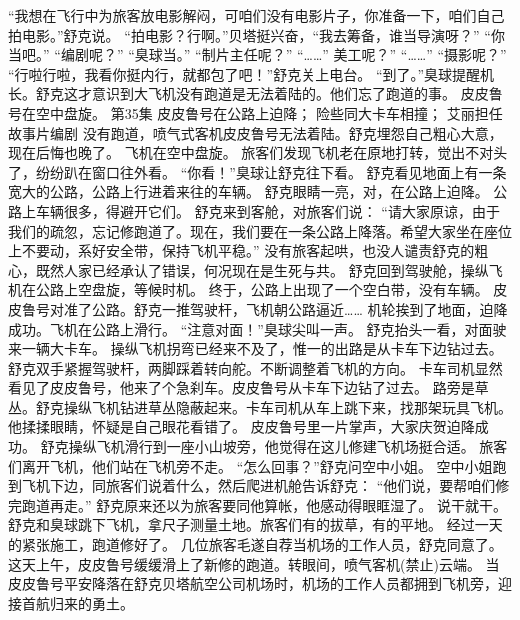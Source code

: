 \documentclass[a4paper,12pt,UTF8,twoside]{ctexbook}
\begin{document}
        “我想在飞行中为旅客放电影解闷，可咱们没有电影片子，你准备一下，咱们自己拍电影。”舒克说。 
        “拍电影？行啊。”贝塔挺兴奋，“我去筹备，谁当导演呀？” 
        “你当吧。” 
        “编剧呢？” 
        “臭球当。” 
        “制片主任呢？” 
        “……” 
        美工呢？” 
        “……” 
        “摄影呢？” 
        “行啦行啦，我看你挺内行，就都包了吧！”舒克关上电台。 
        “到了。”臭球提醒机长。舒克这才意识到大飞机没有跑道是无法着陆的。他们忘了跑道的事。 
        皮皮鲁号在空中盘旋。   第35集 
        皮皮鲁号在公路上迫降； 
        险些同大卡车相撞； 
        艾丽担任故事片编剧   
        没有跑道，喷气式客机皮皮鲁号无法着陆。舒克埋怨自己粗心大意，现在后悔也晚了。 
        飞机在空中盘旋。 
        旅客们发现飞机老在原地打转，觉出不对头了，纷纷趴在窗口往外看。 
        “你看！”臭球让舒克往下看。 
        舒克看见地面上有一条宽大的公路，公路上行进着来往的车辆。 
        舒克眼睛一亮，对，在公路上迫降。 
        公路上车辆很多，得避开它们。 
        舒克来到客舱，对旅客们说： 
        “请大家原谅，由于我们的疏忽，忘记修跑道了。现在，我们要在一条公路上降落。希望大家坐在座位上不要动，系好安全带，保持飞机平稳。” 
        没有旅客起哄，也没人谴责舒克的粗心，既然人家已经承认了错误，何况现在是生死与共。 
        舒克回到驾驶舱，操纵飞机在公路上空盘旋，等候时机。 
        终于，公路上出现了一个空白带，没有车辆。 
        皮皮鲁号对准了公路。舒克一推驾驶杆，飞机朝公路逼近…… 
        机轮挨到了地面，迫降成功。飞机在公路上滑行。 
        “注意对面！”臭球尖叫一声。 
        舒克抬头一看，对面驶来一辆大卡车。 
        操纵飞机拐弯已经来不及了，惟一的出路是从卡车下边钻过去。 
        舒克双手紧握驾驶杆，两脚踩着转向舵。不断调整着飞机的方向。 
        卡车司机显然看见了皮皮鲁号，他来了个急刹车。皮皮鲁号从卡车下边钻了过去。 
        路旁是草丛。舒克操纵飞机钻进草丛隐蔽起来。卡车司机从车上跳下来，找那架玩具飞机。他揉揉眼睛，怀疑是自己眼花看错了。 
        皮皮鲁号里一片掌声，大家庆贺迫降成功。 
        舒克操纵飞机滑行到一座小山坡旁，他觉得在这儿修建飞机场挺合适。 
        旅客们离开飞机，他们站在飞机旁不走。 
        “怎么回事？”舒克问空中小姐。 
        空中小姐跑到飞机下边，同旅客们说着什么，然后爬进机舱告诉舒克： 
        “他们说，要帮咱们修完跑道再走。” 
        舒克原来还以为旅客要同他算帐，他感动得眼眶湿了。 
        说干就干。舒克和臭球跳下飞机，拿尺子测量土地。旅客们有的拔草，有的平地。 
        经过一天的紧张施工，跑道修好了。 
        几位旅客毛遂自荐当机场的工作人员，舒克同意了。 
        这天上午，皮皮鲁号缓缓滑上了新修的跑道。转眼间，喷气客机(禁止)云端。 
        当皮皮鲁号平安降落在舒克贝塔航空公司机场时，机场的工作人员都拥到飞机旁，迎接首航归来的勇土。 
\end{document}
